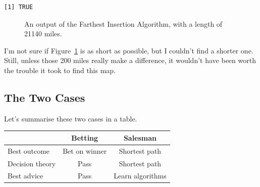 \documentclass[
  11pt,
  letterpaper,
  DIV=11,
  numbers=noendperiod,
  oneside]{scrartcl}
\begin{document}
\begin{verbatim}
[1] TRUE
\end{verbatim}

\begin{figure}


\caption{\label{fig-best}An output of the Farthest Insertion Algorithm,
with a length of 21140 miles.}

\end{figure}%

I'm not sure if Figure~\ref{fig-best} is as short as possible, but I
couldn't find a shorter one. Still, unless those 200 miles really make a
difference, it wouldn't have been worth the trouble it took to find this
map.

\subsection{The Two Cases}\label{the-two-cases}

Let's summarise these two cases in a table.

\begin{longtable}[]{@{}lcc@{}}
\toprule\noalign{}
& Betting & Salesman \\
\midrule\noalign{}
\endhead
\bottomrule\noalign{}
\endlastfoot
Best outcome & Bet on winner & Shortest path \\
Decision theory & Pass & Shortest path \\
Best advice & Pass & Learn algorithms \\
\end{longtable}
\end{document}
